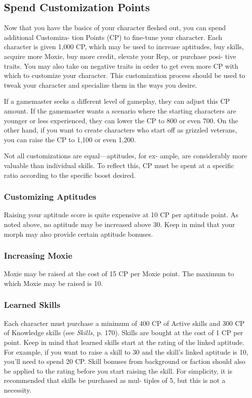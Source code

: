 \subsection{Spend Customization Points}

Now that you have the basics of your character 
fleshed out, you can spend additional Customiza-
tion Points (CP) to fine-tune your character. Each 
character is given 1,000 CP, which may be used to 
increase aptitudes, buy skills, acquire more Moxie, 
buy more credit, elevate your Rep, or purchase posi-
tive traits. You may also take on negative traits in 
order to get even more CP with which to customize 
your character. This customization process should be 
used to tweak your character and specialize them in 
the ways you desire.

If a gamemaster seeks a different level of gameplay, 
they can adjust this CP amount. If the gamemaster 
wants a scenario where the starting characters are 
younger or less experienced, they can lower the CP 
to 800 or even 700. On the other hand, if you want 
to create characters who start off as grizzled veterans, 
you can raise the CP to 1,100 or even 1,200.

Not all customizations are equal—aptitudes, for ex-
ample, are considerably more valuable than individual 
skills. To reflect this, CP must be spent at a specific 
ratio according to the specific boost desired.

\subsubsection{Customizing Aptitudes}

Raising your aptitude score is quite expensive at 10 
CP per aptitude point. As noted above, no aptitude 
may be increased above 30. Keep in mind that your 
morph may also provide certain aptitude bonuses.

\subsubsection{Increasing Moxie}

Moxie may be raised at the cost of 15 CP per Moxie 
point. The maximum to which Moxie may be raised 
is 10.

\subsubsection{Learned Skills}

Each character must purchase a minimum of 400 CP 
of Active skills and 300 CP of Knowledge skills (see 
\textit{Skills,} p. 170). Skills are bought at the cost of 1 CP 
per point. Keep in mind that learned skills start at the 
rating of the linked aptitude. For example, if you want 
to raise a skill to 30 and the skill's linked aptitude 
is 10, you'll need to spend 20 CP. Skill bonuses from 
background or faction should also be applied to the 
rating before you start raising the skill. For simplicity, 
it is recommended that skills be purchased as mul-
tiples of 5, but this is not a necessity.

